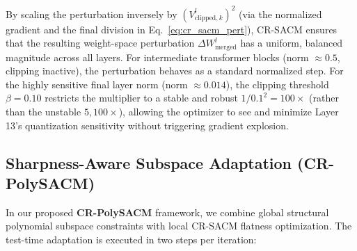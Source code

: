 By scaling the perturbation inversely by $(V_{\text{clipped}, k}^l)^2$ (via the normalized gradient and the final division in Eq.~\ref{eq:cr_sacm_pert}), CR-SACM ensures that the resulting weight-space perturbation $\Delta W_{\text{merged}}^l$ has a uniform, balanced magnitude across all layers. For intermediate transformer blocks (norm $\approx 0.5$, clipping inactive), the perturbation behaves as a standard normalized step. For the highly sensitive final layer norm (norm $\approx 0.014$), the clipping threshold $\beta = 0.10$ restricts the multiplier to a stable and robust $1/0.1^2 = 100\times$ (rather than the unstable $5,100\times$), allowing the optimizer to see and minimize Layer 13's quantization sensitivity without triggering gradient explosion.

\subsection{Sharpness-Aware Subspace Adaptation (CR-PolySACM)}
In our proposed \textbf{CR-PolySACM} framework, we combine global structural polynomial subspace constraints with local CR-SACM flatness optimization. 
The test-time adaptation is executed in two steps per iteration:
